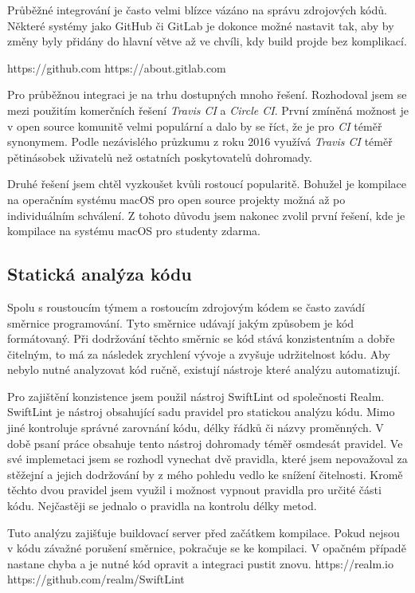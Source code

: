Průběžné integrování je často velmi blízce vázáno na správu zdrojových kódů.
Některé systémy jako GitHub či GitLab je dokonce možné nastavit tak, aby by změny byly přidány do hlavní větve až ve chvíli, kdy build projde bez komplikací. \cite{travis-ci-building-pr}

https://github.com
https://about.gitlab.com

Pro průběžnou integraci je na trhu dostupných mnoho řešení.
Rozhodoval jsem se mezi použitím komerčních řešení \textit{Travis CI} a \textit{Circle CI}.
První zmíněná možnost je v open source komunitě velmi populární a dalo by se říct, že je pro \textit{CI} téměř synonymem.
Podle nezávislého průzkumu z roku 2016 využívá \textit{Travis CI} téměř pětinásobek uživatelů než ostatních poskytovatelů dohromady. \cite{oregonstate-ci-survey}

Druhé řešení jsem chtěl vyzkoušet kvůli rostoucí popularitě. \cite{circleci-popularity}
Bohužel je kompilace na operačním systému macOS pro open source projekty možná až po individuálním schválení. \cite{circleci-pricing}
Z tohoto důvodu jsem nakonec zvolil první řešení, kde je kompilace na systému macOS pro studenty zdarma.

\subsection{Statická analýza kódu}

Spolu s roustoucím týmem a rostoucím zdrojovým kódem se často zavádí směrnice programování.
Tyto směrnice udávají jakým způsobem je kód formátovaný.
Při dodržování těchto směrnic se kód stává konzistentním a dobře čitelným, to má za následek zrychlení vývoje a zvyšuje udržitelnost kódu.
Aby nebylo nutné analyzovat kód ručně, existují nástroje které analýzu automatizují.

Pro zajištění konzistence jsem použil nástroj SwiftLint od společnosti Realm.
SwiftLint je nástroj obsahující sadu pravidel pro statickou analýzu kódu.
Mimo jiné kontroluje správné zarovnání kódu, délky řádků či názvy proměnných.
V době psaní práce obsahuje tento nástroj dohromady téměř osmdesát pravidel.
Ve své implemetaci jsem se rozhodl vynechat dvě pravidla, které jsem nepovažoval za stěžejní a jejich dodržování by z mého pohledu vedlo ke snížení čitelnosti.
Kromě těchto dvou pravidel jsem využil i možnost vypnout pravidla pro určité části kódu.
Nejčastěji se jednalo o pravidla na kontrolu délky metod.

Tuto analýzu zajišťuje buildovací server před začátkem kompilace.
Pokud nejsou v kódu závažné porušení směrnice, pokračuje se ke kompilaci.
V opačném případě nastane chyba a je nutné kód opravit a integraci pustit znovu.
https://realm.io
https://github.com/realm/SwiftLint

